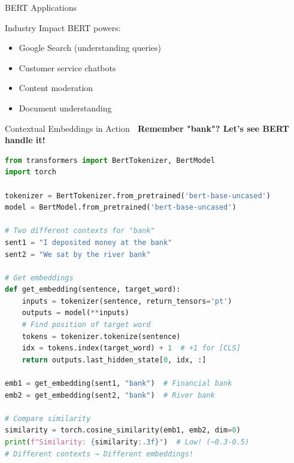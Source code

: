 \documentclass[aspectratio=169]{beamer}
\begin{document}
\begin{frame}[shrink=10]{BERT Applications 🚀}
\vspace{1em}

\begin{block}{Industry Impact}
BERT powers:
\begin{itemize}\setlength{\itemsep}{0pt}
    \item Google Search (understanding queries)
    \item Customer service chatbots
    \item Content moderation
    \item Document understanding
\end{itemize}
\end{block}
\end{frame}

\begin{frame}[fragile]{Contextual Embeddings in Action 🔬}
\textbf{Remember "bank"? Let's see BERT handle it!}

\begin{lstlisting}[language=Python]
from transformers import BertTokenizer, BertModel
import torch

tokenizer = BertTokenizer.from_pretrained('bert-base-uncased')
model = BertModel.from_pretrained('bert-base-uncased')

# Two different contexts for "bank"
sent1 = "I deposited money at the bank"
sent2 = "We sat by the river bank"

# Get embeddings
def get_embedding(sentence, target_word):
    inputs = tokenizer(sentence, return_tensors='pt')
    outputs = model(**inputs)
    # Find position of target word
    tokens = tokenizer.tokenize(sentence)
    idx = tokens.index(target_word) + 1  # +1 for [CLS]
    return outputs.last_hidden_state[0, idx, :]

emb1 = get_embedding(sent1, "bank")  # Financial bank
emb2 = get_embedding(sent2, "bank")  # River bank

# Compare similarity
similarity = torch.cosine_similarity(emb1, emb2, dim=0)
print(f"Similarity: {similarity:.3f}")  # Low! (~0.3-0.5)
# Different contexts → Different embeddings!
\end{lstlisting}
\end{frame}
\end{document}
